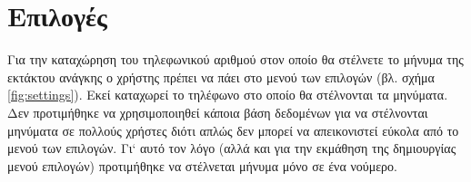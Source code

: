 \documentclass{assignment}
\begin{document}
\section{Επιλογές}

Για την καταχώρηση του τηλεφωνικού αριθμού στον οποίο θα στέλνετε το μήνυμα της εκτάκτου ανάγκης ο χρήστης πρέπει να πάει στο μενού των επιλογών (βλ. σχήμα \ref{fig:settings}). Εκεί καταχωρεί το τηλέφωνο στο οποίο θα στέλνονται τα μηνύματα. Δεν προτιμήθηκε να χρησιμοποιηθεί κάποια βάση δεδομένων για να στέλνονται μηνύματα σε πολλούς χρήστες διότι απλώς δεν μπορεί να απεικονιστεί εύκολα από το μενού των επιλογών. Γι` αυτό τον λόγο (αλλά και για την εκμάθηση της δημιουργίας μενού επιλογών) προτιμήθηκε να στέλνεται μήνυμα μόνο σε ένα νούμερο.

\begin{figure}
\begin{center}
\end{center}
\end{figure}
\end{document}
